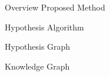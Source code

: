 \begin{frame}[c]{Overview Proposed Method} %
  
\end{frame}

\begin{frame}[fragile]{Hypothesis Algorithm} %
  
\end{frame}

\begin{frame}[fragile]{Hypothesis Graph} %
\end{frame}

\begin{frame}[fragile]{Knowledge Graph} %
\end{frame}
